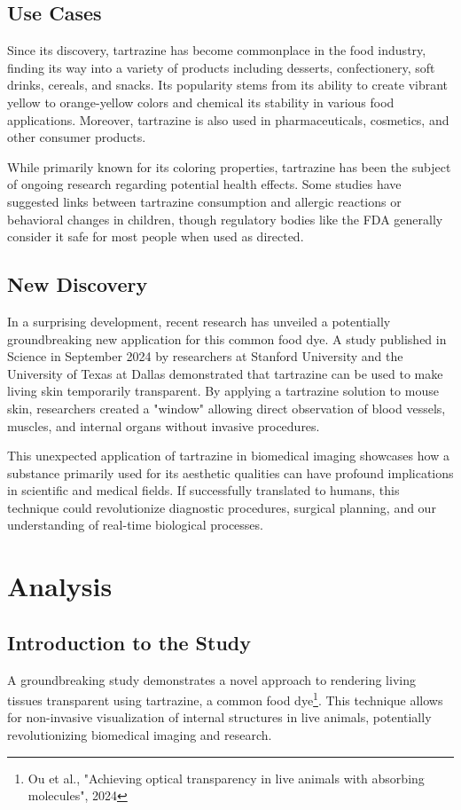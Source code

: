 \documentclass[12pt]{article}
\begin{document}
\subsection{Use Cases}
Since its discovery, tartrazine has become commonplace in the food industry, finding its way into a variety of products including desserts, confectionery, soft drinks, cereals, and snacks. Its popularity stems from its ability to create vibrant yellow to orange-yellow colors and chemical its stability in various food applications. Moreover, tartrazine is also used in pharmaceuticals, cosmetics, and other consumer products.

While primarily known for its coloring properties, tartrazine has been the subject of ongoing research regarding potential health effects. Some studies have suggested links between tartrazine consumption and allergic reactions or behavioral changes in children, though regulatory bodies like the FDA generally consider it safe for most people when used as directed.

\subsection{New Discovery}
In a surprising development, recent research has unveiled a potentially groundbreaking new application for this common food dye. A study published in Science in September 2024 by researchers at Stanford University and the University of Texas at Dallas demonstrated that tartrazine can be used to make living skin temporarily transparent. By applying a tartrazine solution to mouse skin, researchers created a "window" allowing direct observation of blood vessels, muscles, and internal organs without invasive procedures.

This unexpected application of tartrazine in biomedical imaging showcases how a substance primarily used for its aesthetic qualities can have profound implications in scientific and medical fields. If successfully translated to humans, this technique could revolutionize diagnostic procedures, surgical planning, and our understanding of real-time biological processes.


\section{Analysis}
\label{sec:analysis}

\subsection{Introduction to the Study}
A groundbreaking study demonstrates a novel approach to rendering living tissues transparent using tartrazine, a common food dye\footnote{Ou et al., "Achieving optical transparency in live animals with absorbing molecules", 2024}. This technique allows for non-invasive visualization of internal structures in live animals, potentially revolutionizing biomedical imaging and research. 
\end{document}
